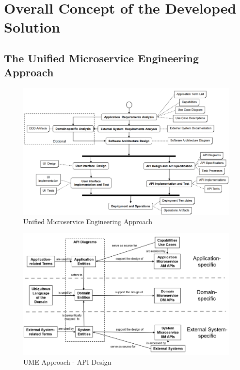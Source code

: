 \chapter{Overall Concept of the Developed Solution}
\label{cha:concept}


\section{The Unified Microservice Engineering Approach}
\label{sec:ume_approach}


\begin{figure}[h]
	\centering
	\includegraphics[width=\textwidth]{figures/ume_approach.png}
	\caption{Unified Microservice Engineering Approach \cite{CM-W-OVW}}
	\label{fig:ume_approach}
\end{figure}

\begin{figure}[h]
	\centering
	\includegraphics[width=\textwidth]{figures/ume_approach_api_design.png}
	\caption{UME Approach - API Design \cite{CM-W-DES}}
	\label{fig:ume_approach_api_design}
\end{figure}


